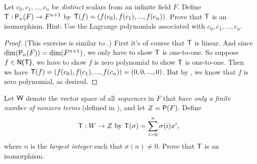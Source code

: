 \begin{exercise} \label{exercise 2.4.22}
Let \(c_0, c_1, ..., c_n\) be \emph{distinct} scalars from an infinite field \(F\).
Define \(\textsf{T}: \textsf{P}_n(F) \to F^{n + 1}\) by \(\textsf{T}(f) = (f(c_0), f(c_1), ..., f(c_n))\).
Prove that \(\textsf{T}\) is an isomorphism.
Hint: Use the Lagrange polynomials associated with \(c_0, c_1, ..., c_n\).
\end{exercise}

\begin{proof}
(This exercise is similar to .)
First it's of course that \(\textsf{T}\) is linear.
And since \(\dim(\textsf{P}_n(F)) = \dim(F^{n + 1})\), we only have to show \(\textsf{T}\) is one-to-one.
So suppose \(f \in \textsf{N(T)}\), we have to show \(f\) is zero polynomial to show \(\textsf{T}\) is one-to-one.
Then we have \(\textsf{T}(f) = (f(c_0), f(c_1), ..., f(c_n)) = (0, 0, ..., 0)\).
But by , we know that \(f\) is zero polynomial, as desired.
\end{proof}

\begin{exercise} \label{exercise 2.4.23}
Let \(\textsf{W}\) denote the vector space of all \emph{sequences} in \(F\) that \emph{have only a finite number of nonzero terms} (defined in ),
and let \(Z = \textsf{P}(F)\).
Define
\[
    \textsf{T} : W \to Z \text{ by } \textsf{T}(\sigma) = \sum_{i = 0}^n \sigma(i)x^i,
\]
where \(n\) is the \emph{largest integer} such that \(\sigma(n) \ne 0\). Prove that \(\textsf{T}\) is an isomorphism.
\end{exercise}


